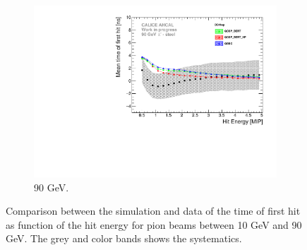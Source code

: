 \begin{figure}[htbp!]
\begin{subfigure}[t]{0.5\textwidth}
    \includegraphics[width=1\textwidth]{../Thesis_Plots/Timing/Pions/Plots/ComparisonToSim/Time_Energy_90GeV_DD4hep.pdf}
    \caption{90 GeV.} \label{fig:Energy_SimData_90GeV_DD4hep}
  \end{subfigure}
  \caption{Comparison between the \ddhep simulation and data of the time of first hit as function of the hit energy for pion beams between 10 GeV and 90 GeV. The grey and color bands shows the systematics.}
\end{figure}


